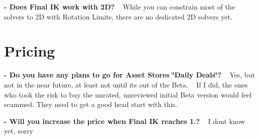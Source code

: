 {\bfseries -\/ Does Final IK work with 2D?} ~\newline
While you can constrain most of the solvers to 2D with Rotation Limits, there are no dedicated 2D solvers yet.\hypertarget{page14_Pricing}{}\section{Pricing}\label{page14_Pricing}
{\bfseries -\/ Do you have any plans to go for Asset Store\textquotesingle{}s \char`\"{}\+Daily Deals\char`\"{}?} ~\newline
 Yes, but not in the near future, at least not until it\textquotesingle{}s out of the Beta. ~\newline
 If I did, the ones who took the risk to buy the unrated, unreviewed initial Beta version would feel scammed. They need to get a good head start with this.

{\bfseries -\/ Will you increase the price when Final IK reaches 1.?} ~\newline
 I don\textquotesingle{}t know yet, sorry  